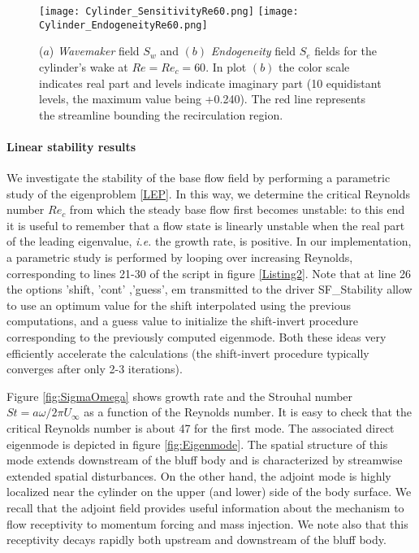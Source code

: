 \documentclass[twocolumn,10pt]{asme2ej}
\begin{document}
\begin{figure}
\texttt{[image: Cylinder\_SensitivityRe60.png]}
\texttt{[image: Cylinder\_EndogeneityRe60.png]}
\caption{ ($a$) {\em Wavemaker}  field $S_w$ and $(b)$ {\em Endogeneity} field $S_e$ fields for the cylinder's wake at $Re=Re_c = 60$.  In plot $(b)$ the color scale indicates real part and levels indicate imaginary part (10 equidistant levels, the maximum value being +0.240). The red line represents the streamline bounding the recirculation region.}
\label{fig:StructEndo}
\end{figure}




\paragraph{Linear stability results}

We investigate the stability of the base flow field by performing a parametric study of the eigenproblem \eqref{LEP}. 
In this way, we determine the critical Reynolds number $Re_c$ from which the steady base flow first becomes unstable: to this end it is useful to remember that a flow state is linearly unstable when the real part of  the leading eigenvalue, \textit{i.e.} the growth rate, is positive.
In our implementation, a parametric study is performed by looping over increasing Reynolds, corresponding to lines 21-30 of the script in figure \ref{Listing2}.
Note that at line 26 the options {\sf  'shift, 'cont' ,'guess', em} transmitted to the driver {\sf  SF\_Stability} allow to use an optimum value for the shift interpolated using the previous computations, and a guess value to initialize the shift-invert procedure corresponding to the previously computed eigenmode.
Both these ideas very efficiently accelerate the calculations (the shift-invert procedure typically converges after only 2-3 iterations).

Figure \ref{fig:SigmaOmega} shows growth rate and the Strouhal number $St=a\omega/2 \pi U_{\infty}$ as a function of the Reynolds number.
It is easy to check that the critical Reynolds number is about 47 for the first mode.
The associated direct eigenmode is depicted in figure \ref{fig:Eigenmode}.
The spatial structure of this mode extends downstream of the bluff body and is characterized by streamwise extended spatial disturbances.
On the other hand, the adjoint mode is highly localized near the cylinder on the upper (and lower) side of the body surface.
We recall that the adjoint field provides useful information about the mechanism to flow receptivity to momentum forcing and mass injection.
We note also that this receptivity decays rapidly both upstream and downstream of the bluff body.
\end{document}
